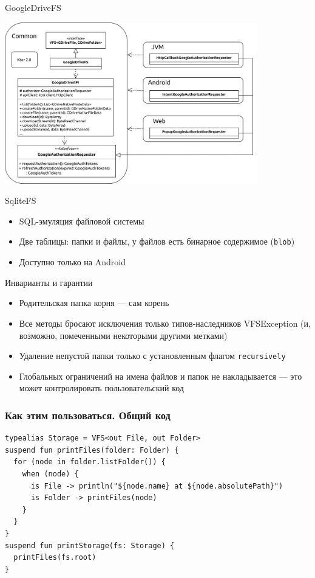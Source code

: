 \documentclass[14pt,aspectratio=169,hyperref={pdftex,unicode},xcolor=dvipsnames]{beamer}
\begin{document}
\begin{frame}{GoogleDriveFS}
\begin{center}
\includegraphics[width=11cm,keepaspectratio]{gdrive-multiplatform-arch}
\end{center}
\end{frame}

\begin{frame}{SqliteFS}
  \begin{itemize}
    \item SQL-эмуляция файловой системы
    \item Две таблицы: папки и файлы, у файлов есть бинарное содержимое (\texttt{blob})
    \item Доступно только на Android
  \end{itemize}
\end{frame}

\begin{frame}{Инварианты и гарантии}
  \begin{itemize}
    \item Родительская папка корня --- сам корень
    \item Все методы бросают исключения только типов-наследников VFSException (и, возможно, помеченными некоторыми другими метками)
    \item Удаление непустой папки только с установленным флагом \texttt{recursively}
    \item Глобальных ограничений на имена файлов и папок не накладывается --- это может контролировать пользовательский код
  \end{itemize}
\end{frame}

\begin{frame}[fragile]
\frametitle{Как этим пользоваться. Общий код}
\begin{verbatim}
typealias Storage = VFS<out File, out Folder>
suspend fun printFiles(folder: Folder) {
  for (node in folder.listFolder()) {
    when (node) {
      is File -> println("${node.name} at ${node.absolutePath}")
      is Folder -> printFiles(node)
    }
  }
}
suspend fun printStorage(fs: Storage) {
  printFiles(fs.root)
}
\end{verbatim}
\end{frame}
\end{document}
